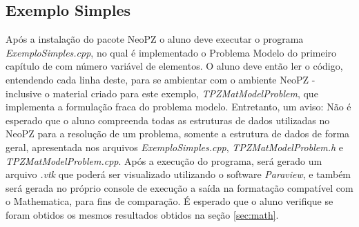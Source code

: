 \documentclass[11pt, oneside, hidelinks]{article}   	%
\begin{document}
\subsection{Exemplo Simples}
Após a instalação do pacote NeoPZ o aluno deve executar o programa \emph{ExemploSimples.cpp}, no qual é implementado o Problema Modelo do primeiro capítulo de \citet{oden81} com número variável de elementos. O aluno deve então ler o código, entendendo cada linha deste, para se ambientar com o ambiente NeoPZ - inclusive o material criado para este exemplo, \emph{TPZMatModelProblem}, que implementa a formulação fraca do problema modelo. Entretanto, um aviso: Não é esperado que o aluno compreenda todas as estruturas de dados utilizadas no NeoPZ para a resolução de um problema, somente a estrutura de dados de forma geral, apresentada nos arquivos \emph{ExemploSimples.cpp}, \emph{TPZMatModelProblem.h} e  \emph{TPZMatModelProblem.cpp}. Após a execução do programa, será gerado um arquivo \emph{.vtk} que poderá ser visualizado utilizando o software \emph{Paraview}, e também será gerada no próprio console de execução a saída na formatação compatível com o Mathematica, para fins de comparação. É esperado que o aluno verifique se foram obtidos os mesmos resultados obtidos na seção \ref{sec:math}.
\newpage


\end{document}
